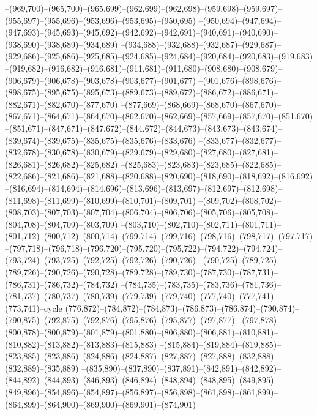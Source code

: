 --(969,700)--(965,700)--(965,699)--(962,699)--(962,698)--(959,698)--(959,697)--(955,697)--(955,696)--(953,696)--(953,695)--(950,695)
--(950,694)--(947,694)--(947,693)--(945,693)--(945,692)--(942,692)--(942,691)--(940,691)--(940,690)--(938,690)--(938,689)--(934,689)
--(934,688)--(932,688)--(932,687)--(929,687)--(929,686)--(925,686)--(925,685)--(924,685)--(924,684)--(920,684)--(920,683)--(919,683)
--(919,682)--(916,682)--(916,681)--(911,681)--(911,680)--(908,680)--(908,679)--(906,679)--(906,678)--(903,678)--(903,677)--(901,677)
--(901,676)--(898,676)--(898,675)--(895,675)--(895,673)--(889,673)--(889,672)--(886,672)--(886,671)--(882,671)--(882,670)--(877,670)
--(877,669)--(868,669)--(868,670)--(867,670)--(867,671)--(864,671)--(864,670)--(862,670)--(862,669)--(857,669)--(857,670)--(851,670)
--(851,671)--(847,671)--(847,672)--(844,672)--(844,673)--(843,673)--(843,674)--(839,674)--(839,675)--(835,675)--(835,676)--(833,676)
--(833,677)--(832,677)--(832,678)--(830,678)--(830,679)--(829,679)--(829,680)--(827,680)--(827,681)--(826,681)--(826,682)--(825,682)
--(825,683)--(823,683)--(823,685)--(822,685)--(822,686)--(821,686)--(821,688)--(820,688)--(820,690)--(818,690)--(818,692)--(816,692)
--(816,694)--(814,694)--(814,696)--(813,696)--(813,697)--(812,697)--(812,698)--(811,698)--(811,699)--(810,699)--(810,701)--(809,701)
--(809,702)--(808,702)--(808,703)--(807,703)--(807,704)--(806,704)--(806,706)--(805,706)--(805,708)--(804,708)--(804,709)--(803,709)
--(803,710)--(802,710)--(802,711)--(801,711)--(801,712)--(800,712)--(800,714)--(799,714)--(799,716)--(798,716)--(798,717)--(797,717)
--(797,718)--(796,718)--(796,720)--(795,720)--(795,722)--(794,722)--(794,724)--(793,724)--(793,725)--(792,725)--(792,726)--(790,726)
--(790,725)--(789,725)--(789,726)--(790,726)--(790,728)--(789,728)--(789,730)--(787,730)--(787,731)--(786,731)--(786,732)--(784,732)
--(784,735)--(783,735)--(783,736)--(781,736)--(781,737)--(780,737)--(780,739)--(779,739)--(779,740)--(777,740)--(777,741)--(773,741)--cycle
(776,872)--(784,872)--(784,873)--(786,873)--(786,874)--(790,874)--(790,875)--(792,875)--(792,876)--(795,876)--(795,877)--(797,877)
--(797,878)--(800,878)--(800,879)--(801,879)--(801,880)--(806,880)--(806,881)--(810,881)--(810,882)--(813,882)--(813,883)--(815,883)
--(815,884)--(819,884)--(819,885)--(823,885)--(823,886)--(824,886)--(824,887)--(827,887)--(827,888)--(832,888)--(832,889)--(835,889)
--(835,890)--(837,890)--(837,891)--(842,891)--(842,892)--(844,892)--(844,893)--(846,893)--(846,894)--(848,894)--(848,895)--(849,895)
--(849,896)--(854,896)--(854,897)--(856,897)--(856,898)--(861,898)--(861,899)--(864,899)--(864,900)--(869,900)--(869,901)--(874,901)

